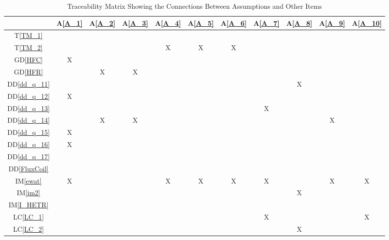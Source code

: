 \documentclass[12pt]{article}
\newcommand{\dref}[1]{GD\ref{#1}}
\newcommand{\ddref}[1]{DD\ref{#1}}
\newcommand{\tref}[1]{T\ref{#1}}
\newcommand{\aref}[1]{A\ref{#1}}
\newcommand{\iref}[1]{IM\ref{#1}}
\newcommand{\lcref}[1]{LC\ref{#1}}
\begin{document}
\begin{table}[h!]
\centering
\begin{tabular}{|c|c|c|c|c|c|c|c|c|c|c|}
\hline
	& \aref{A_1}& \aref{A_2}& \aref{A_3}& \aref{A_4}& \aref{A_5}& \aref{A_6}& \aref{A_7}& \aref{A_8} &\aref{A_9} & \aref{A_10} \\

 

\hline
\tref{TM_1}     & & & & & & & & & &  \\ \hline
\tref{TM_2}     & & & & X&X &X & & & & \\ \hline
\dref{HFC}        & X& & & & & & &  & & \\ \hline
\dref{HFR}      & & X& X& & & & & & & \\ \hline
\ddref{dd_q_11} & & & & & & & & X & & \\ \hline
\ddref{dd_q_12} &X & & & & & & &  & & \\ \hline
\ddref{dd_q_13} & & & & & & &X &  & & \\ \hline
\ddref{dd_q_14}  & &X &X & & & & & &X & \\ \hline
\ddref{dd_q_15}    & X& & & & & & &  & & \\ \hline
\ddref{dd_q_16}     & X& & & & & & & & & \\ \hline
\ddref{dd_q_17}     & & & & & & & &  & & \\ \hline
\ddref{FluxCoil}     & & & & & & & &  & & \\ \hline
\iref{ewat}      & X& & &X &X &X &X &  & X &X \\ \hline
\iref{im2}      & & & & & & & &X  & & \\ \hline
\iref{I_HETR}      & & & & & & & &  & & \\ \hline
\lcref{LC_1}      & & & & & & & X&  & & X  \\ \hline
\lcref{LC_2}      & & & & & & & & X & & \\

\hline
\end{tabular}
\caption{Traceability Matrix Showing the Connections Between Assumptions and Other Items}
\label{Table:A_trace}
~\newline
\end{table}
\end{document}
